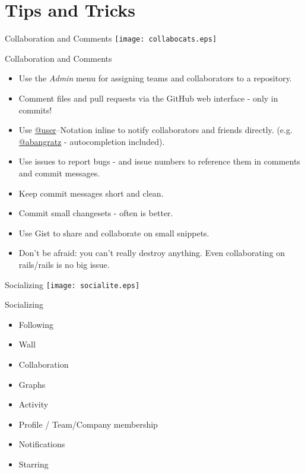 \documentclass[style=husky,display=slides,clock]{powerdot}
\begin{document}
\section{Tips and Tricks}
\begin{slide}{Collaboration and Comments}
	\texttt{[image: collabocats.eps]}
\end{slide}
\begin{note}{Collaboration and Comments}
	\begin{itemize}
		\item Use the \textit{Admin} menu for assigning teams and collaborators to a repository.
		\item Comment files and pull requests via the GitHub web interface - only in commits!
		\item Use \url{@user}--Notation inline to notify collaborators and friends directly. (e.g. \url{@abangratz} -
			autocompletion included).
		\item Use issues to report bugs - and issue numbers to reference them in comments and commit messages.
		\item Keep commit messages short and clean.
		\item Commit small changesets - often is better.
		\item Use Gist to share and collaborate on small snippets.
		\item Don't be afraid: you can't really destroy anything. Even collaborating on rails/rails is no big issue.
	\end{itemize}
\end{note}
\begin{slide}{Socializing}
	\texttt{[image: socialite.eps]}
\end{slide}
\begin{note}{Socializing}
	\begin{itemize}
		\item Following
		\item Wall
		\item Collaboration
		\item Graphs
		\item Activity
		\item Profile / Team/Company membership
		\item Notifications
		\item Starring
	\end{itemize}
\end{note}
\end{document}
